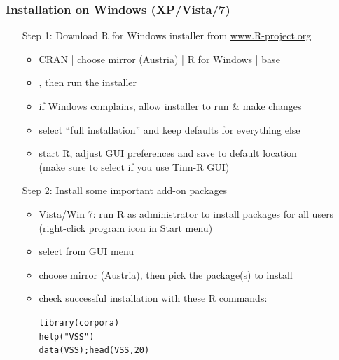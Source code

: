 \documentclass[t]{beamer} %
\begin{document}
\begin{frame}[fragile]
  \frametitle{Installation on Windows (XP/Vista/7)}
  
  \begin{itemize}
  \item[Step 1:] Download R for Windows installer from \url{www.R-project.org}
    \begin{itemize}
    \item CRAN | choose mirror (Austria) | R for Windows | base
    \item {}, then run the installer
    \item if Windows complains, allow installer to run \& make changes
    \item select ``full installation'' and keep defaults for everything else
    \item start R, adjust GUI preferences and save to default location\\
      (make sure to select  if you use Tinn-R GUI)
    \item[]
    \end{itemize}
    \pause
  \item[Step 2:] Install some important add-on packages
    \begin{itemize}
    \item Vista/Win 7: run R as administrator to install packages for all
      users (right-click program icon in Start menu)
    \item select  from GUI menu
    \item choose mirror (Austria), then pick the package(s) to install
    \item check successful installation with these R commands:
      \begin{scriptsize}
        \begin{alltt}
library(corpora)
help("VSS") 
data(VSS); head(VSS, 20)
        \end{alltt}
      \end{scriptsize}
    \end{itemize}
  \end{itemize}
\end{frame}
\end{document}
